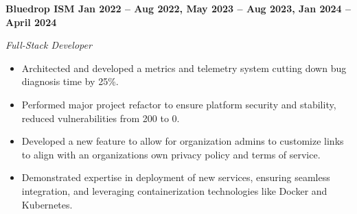 \vspace{0.1cm}
\textbf{Bluedrop ISM \hfill Jan 2022 -- Aug 2022, May 2023 -- Aug 2023, Jan 2024 -- April 2024} \par
\textit{Full-Stack Developer} \par
\begin{itemize}
	\item Architected and developed a metrics and telemetry system cutting down bug diagnosis time by 25\%.
    \item Performed major project refactor to ensure platform security and stability, reduced vulnerabilities from 200 to 0.
    \item Developed a new feature to allow for organization admins to customize links to align with an organizations own privacy policy and terms of service.
    \item Demonstrated expertise in deployment of new services, ensuring seamless integration, and leveraging containerization technologies like Docker and Kubernetes.
\end{itemize} \par